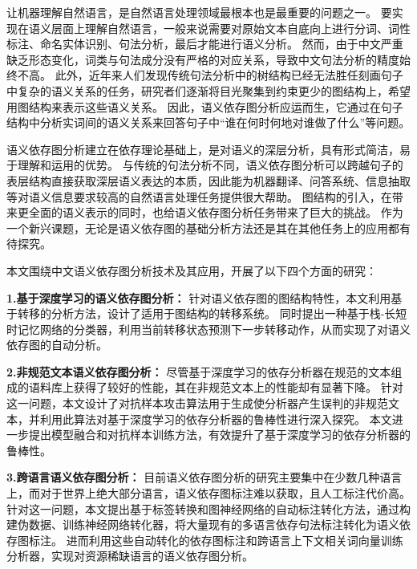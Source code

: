 \begin{cabstract}

让机器理解自然语言，是自然语言处理领域最根本也是最重要的问题之一。
要实现在语义层面上理解自然语言，一般来说需要对原始文本自底向上进行分词、词性标注、命名实体识别、句法分析，最后才能进行语义分析。
然而，由于中文严重缺乏形态变化，词类与句法成分没有严格的对应关系，导致中文句法分析的精度始终不高。
此外，近年来人们发现传统句法分析中的树结构已经无法胜任刻画句子中复杂的语义关系的任务，研究者们逐渐将目光聚集到约束更少的图结构上，希望用图结构来表示这些语义关系。
因此，语义依存图分析应运而生，它通过在句子结构中分析实词间的语义关系来回答句子中“谁在何时何地对谁做了什么”等问题。

语义依存图分析建立在依存理论基础上，是对语义的深层分析，具有形式简洁，易于理解和运用的优势。
与传统的句法分析不同，语义依存图分析可以跨越句子的表层结构直接获取深层语义表达的本质，因此能为机器翻译、问答系统、信息抽取等对语义信息要求较高的自然语言处理任务提供很大帮助。
图结构的引入，在带来更全面的语义表示的同时，也给语义依存图分析任务带来了巨大的挑战。
作为一个新兴课题，无论是语义依存图的基础分析方法还是其在其他任务上的应用都有待探究。

本文围绕中文语义依存图分析技术及其应用，开展了以下四个方面的研究：

\textbf{1.基于深度学习的语义依存图分析：}  
针对语义依存图的图结构特性，本文利用基于转移的分析方法，设计了适用于图结构的转移系统。
同时提出一种基于栈-长短时记忆网络的分类器，利用当前转移状态预测下一步转移动作，从而实现了对语义依存图的自动分析。

\textbf{2.非规范文本语义依存图分析：}
尽管基于深度学习的依存分析器在规范的文本组成的语料库上获得了较好的性能，其在非规范文本上的性能却有显著下降。
针对这一问题，本文设计了对抗样本攻击算法用于生成使分析器产生误判的非规范文本，并利用此算法对基于深度学习的依存分析器的鲁棒性进行深入探究。
本文进一步提出模型融合和对抗样本训练方法，有效提升了基于深度学习的依存分析器的鲁棒性。

\textbf{3.跨语言语义依存图分析：}
目前语义依存图分析的研究主要集中在少数几种语言上，而对于世界上绝大部分语言，语义依存图标注难以获取，且人工标注代价高。
针对这一问题，本文提出基于标签转换和图神经网络的自动标注转化方法，通过构建伪数据、训练神经网络转化器，将大量现有的多语言依存句法标注转化为语义依存图标注。
进而利用这些自动转化的依存图标注和跨语言上下文相关词向量训练分析器，实现对资源稀缺语言的语义依存图分析。


\end{cabstract}
